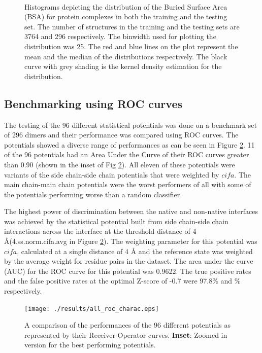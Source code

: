 \vfill

\begin{figure}
	\centering
	\\
	\caption[BSA Distributions for training and testing sets]{Histograms depicting the distribution of the Buried Surface Area (BSA) for protein complexes in both the training and the testing set. The number of structures in the training and the testing sets are 3764 and 296 respectively. The binwidth used for plotting the distribution was 25. The red and blue lines on the plot represent the mean and the median of the distributions respectively. The black curve with grey shading is the kernel density estimation for the distribution.}
	\label{SASA_plot}
\end{figure}

\subsection{Benchmarking using ROC curves}
The testing of the 96 different statistical potentials was done on a benchmark set of 296 dimers and their performance was compared using ROC curves. The potentials showed a diverse range of performances as can be seen in Figure \ref{multi-ROC}. 11 of the 96 potentials had an Area Under the Curve of their ROC curves greater than 0.90 (shown in the inset of Fig \ref{multi-ROC}). All eleven of these potentials were variants of the side chain-side chain potentials that were weighted by $cifa$. The main chain-main chain potentials were the worst performers of all with some of the potentials performing worse than a random classifier.
\par The highest power of discrimination between the native and non-native interfaces was achieved by the statistical potential built from side chain-side chain interactions across the interface at the threshold distance of 4 \AA \;(4.ss.norm.cifa.avg in Figure \ref{multi-ROC}). The weighting parameter for this potential was $cifa$, calculated at a single distance of 4 \AA \; and the reference state was weighted by the average weight for residue pairs in the dataset. The area under the curve (AUC) for the ROC curve for this potential was 0.9622. The true positive rates and the false positive rates at the optimal Z-score of -0.7 were 97.8\%  and \% respectively. 

\begin{figure}[ht]
	\centering
	\texttt{[image: ./results/all\_roc\_charac.eps]}
	\caption[ROC curves for the pairwise potentials]{A comparison of the performances of the 96 different potentials as represented by their Receiver-Operator curves. \textbf{Inset}: Zoomed in version for the best performing potentials. }
	\label{multi-ROC}
\end{figure}

